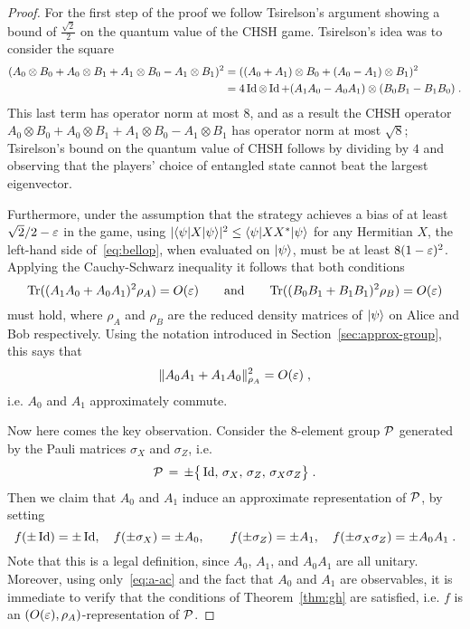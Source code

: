 \begin{proof}
For the first step of the proof we follow Tsirelson's argument showing a bound of $\frac{\sqrt{2}}{2}$ on the quantum value of the CHSH game. Tsirelson's idea was to consider the square
\begin{align}
(A_0\otimes B_0 + A_0\otimes B_1 + A_1\otimes B_0 - A_1\otimes B_1 )^2 &=( (A_0+A_1)\otimes B_0 + (A_0-A_1)\otimes B_1 )^2\label{eq:bellop}\\
&= 4\mathop{\rm Id}\nolimits\otimes \mathop{\rm Id}\nolimits + (A_1A_0-A_0A_1)\otimes (B_0B_1-B_1B_0)\;.\notag
\end{align}
This last term has operator norm at most $8$, and as a result the CHSH operator $A_0\otimes B_0 + A_0\otimes B_1 + A_1\otimes B_0 - A_1\otimes B_1$ has operator norm at most $\sqrt{8}$; Tsirelson's bound on the quantum value of CHSH follows by dividing by $4$ and observing that the players' choice of entangled state cannot beat the largest eigenvector.

Furthermore, under the assumption that the strategy achieves a bias of at least $\sqrt{2}/2-\varepsilon$ in the game, using $|\langle\psi|X|\psi\rangle|^2 \leq \langle\psi|XX^*|\psi\rangle$ for any Hermitian $X$, the left-hand side of~\eqref{eq:bellop}, when evaluated on $|\psi\rangle$, must be at least $8(1-\varepsilon)^2$. Applying the Cauchy-Schwarz inequality it follows that both conditions
$$\mbox{\rm Tr}((A_1A_0 + A_0A_1)^2\rho_A) = O({\varepsilon})\qquad \text{and}\qquad \mbox{\rm Tr}((B_0B_1+B_1B_1)^2 \rho_B) = O({\varepsilon})$$
must hold, where $\rho_A$ and $\rho_B$ are the reduced density matrices of $|\psi\rangle$ on Alice and Bob respectively. 
Using the notation introduced in Section~\ref{sec:approx-group}, this says that 
\begin{equation}\label{eq:a-ac}
\|A_0A_1 + A_1A_0\|_{\rho_A}^2 = O({\varepsilon})\;,
\end{equation}
 i.e. $A_0$ and $A_1$ approximately commute. 

Now here comes the key observation. Consider the $8$-element group $\mathcal{P}$ generated by the Pauli matrices $\sigma_X$ and $\sigma_Z$, i.e. 
$$\mathcal{P}\,=\,\pm\big\{ \mathop{\rm Id}\nolimits,\, \sigma_X,\,\sigma_Z,\, \sigma_X\sigma_Z\big\}\;.$$
Then we claim that $A_0$ and $A_1$ induce an approximate representation of $\mathcal{P}$, by setting 
$$ f(\pm \mathop{\rm Id}\nolimits)=\pm\mathop{\rm Id}\nolimits,\quad f(\pm\sigma_X)=\pm A_0,\quad\quad f(\pm\sigma_Z)=\pm A_1,\quad f(\pm\sigma_X\sigma_Z) = \pm A_0A_1\;.$$
Note that this is a legal definition, since $A_0$, $A_1$, and $A_0A_1$ are all unitary. Moreover, using only~\eqref{eq:a-ac} and the fact that $A_0$ and $A_1$ are observables, it is immediate to verify that the conditions of Theorem~\ref{thm:gh} are satisfied, i.e. $f$ is an $(O({\varepsilon}),\rho_A)$-representation of $\mathcal{P}$. 


\end{proof}

